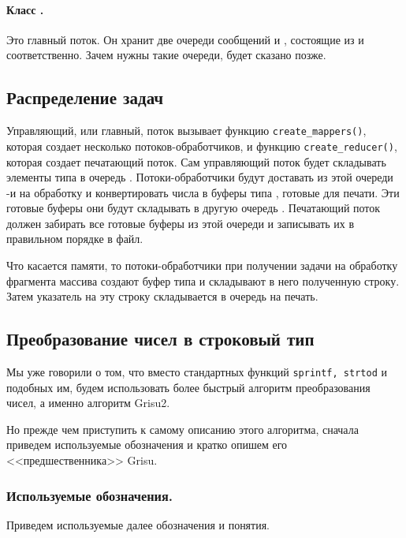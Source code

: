 \paragraph{Класс \texttt{}.}
Это главный поток.
Он хранит две очереди сообщений \texttt{} и \texttt{}, состоящие из \texttt{} и \texttt{} соответственно. 
Зачем нужны такие очереди, будет сказано позже.

\subsection{Распределение задач}
Управляющий, или главный, поток \texttt{} вызывает функцию \texttt{create\_mappers()}, которая создает несколько потоков-обработчиков, и функцию \texttt{create\_reducer()}, которая создает печатающий поток.
Сам управляющий поток будет складывать элементы типа \texttt{} в очередь \texttt{}.
Потоки-обработчики будут доставать из этой очереди \texttt{}-и на обработку и конвертировать числа в буферы типа \texttt{}, готовые для печати.
Эти готовые буферы они будут складывать в другую очередь \texttt{}.
Печатающий поток должен забирать все готовые буферы из этой очереди и записывать их в правильном порядке в файл.

Что касается памяти, то потоки-обработчики при получении задачи на обработку фрагмента массива создают буфер типа \texttt{} и складывают в него полученную строку. 
Затем указатель на эту строку складывается в очередь на печать.

\subsection{Преобразование чисел в строковый тип}
Мы уже говорили о том, что вместо стандартных функций \texttt{sprintf, strtod} и подобных им, будем использовать более быстрый алгоритм преобразования чисел, а именно алгоритм \textsf{Grisu2}.

Но прежде чем приступить к самому описанию этого алгоритма, сначала приведем используемые обозначения и кратко опишем его <<предшественника>> \textsf{Grisu}.  

\subsubsection{Используемые обозначения.}
Приведем используемые далее обозначения и понятия.

